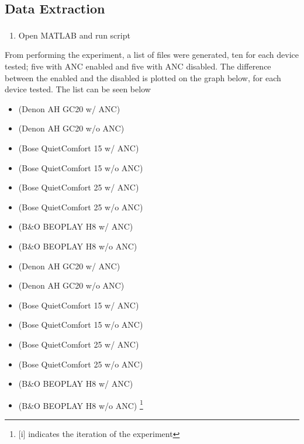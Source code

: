 		
\subsection{Data Extraction}
\begin{enumerate}
	\item Open MATLAB\textsuperscript{\textregistered} and run script 
\end{enumerate}

From performing the experiment, a list of files were generated, ten for each device tested; five with ANC enabled and five with ANC disabled.
The difference between the enabled and the disabled is plotted on the graph below, for each device tested. The list can be seen below

\begin{itemize}
	\item {}			(Denon AH GC20 w/ ANC)
	\item {}		(Denon AH GC20 w/o ANC)
	\item {}		(Bose QuietComfort 15 w/ ANC)
	\item {}		(Bose QuietComfort 15 w/o ANC)
	\item {}		(Bose QuietComfort 25 w/ ANC)
	\item {}		(Bose QuietComfort 25 w/o ANC)
	\item {}			(B\&O BEOPLAY H8 w/ ANC)
	\item {}			(B\&O BEOPLAY H8 w/o ANC)
	\item {}		(Denon AH GC20 w/ ANC)
	\item {}		(Denon AH GC20 w/o ANC)
	\item {}		(Bose QuietComfort 15 w/ ANC)
	\item {}		(Bose QuietComfort 15 w/o ANC)
	\item {}		(Bose QuietComfort 25 w/ ANC)
	\item {}		(Bose QuietComfort 25 w/o ANC)
	\item {}			(B\&O BEOPLAY H8 w/ ANC)
	\item {}		(B\&O BEOPLAY H8 w/o ANC)
	\footnote{[i] indicates the iteration of the experiment}
\end{itemize}


